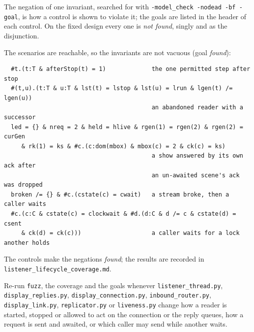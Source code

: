 \documentclass[a4paper,10pt,fleqn]{article}
\begin{document}
The negation of one invariant, searched for with
\texttt{-model\_check -nodead -bf -goal}, is how a control is shown to
violate it; the goals are listed in the header of each control.  On the fixed
design every one is \emph{not found}, singly and as the disjunction.

The scenarios are reachable, so the invariants are not vacuous (goal
\emph{found}):
\begin{verbatim}
  #t.(t:T & afterStop(t) = 1)             the one permitted step after stop
  #(t,u).(t:T & u:T & lst(t) = lstop & lst(u) = lrun & lgen(t) /= lgen(u))
                                          an abandoned reader with a successor
  led = {} & nreq = 2 & held = hlive & rgen(1) = rgen(2) & rgen(2) = curGen
     & rk(1) = ks & #c.(c:dom(mbox) & mbox(c) = 2 & ck(c) = ks)
                                          a show answered by its own ack after
                                          an un-awaited scene's ack was dropped
  broken /= {} & #c.(cstate(c) = cwait)   a stream broke, then a caller waits
  #c.(c:C & cstate(c) = clockwait & #d.(d:C & d /= c & cstate(d) = csent
     & ck(d) = ck(c)))                    a caller waits for a lock another holds
\end{verbatim}

The controls make the negations \emph{found}; the results are recorded in
\texttt{listener\_lifecycle\_coverage.md}.

Re-run \texttt{fuzz}, the coverage and the goals whenever
\texttt{listener\_thread.py}, \texttt{display\_replies.py},
\texttt{display\_connection.py}, \texttt{inbound\_router.py},
\texttt{display\_link.py}, \texttt{replicator.py} or \texttt{liveness.py}
change how a reader is started, stopped or allowed to act on the connection or
the reply queues, how a request is sent and awaited, or which caller may send
while another waits.
\end{document}
